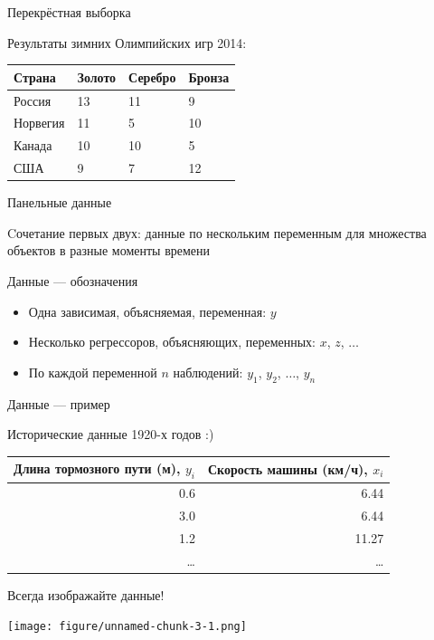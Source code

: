 \documentclass[russian,ignorenonframetext,]{beamer}
\providecommand{\tightlist}{%
  \setlength{\itemsep}{0pt}\setlength{\parskip}{0pt}}
\begin{document}
\begin{frame}{Перекрёстная выборка}

Результаты зимних Олимпийских игр 2014:

\begin{longtable}[c]{@{}llll@{}}
\toprule
Страна & Золото & Серебро & Бронза\tabularnewline
\midrule
\endhead
Россия & 13 & 11 & 9\tabularnewline
Норвегия & 11 & 5 & 10\tabularnewline
Канада & 10 & 10 & 5\tabularnewline
США & 9 & 7 & 12\tabularnewline
\bottomrule
\end{longtable}

\end{frame}

\begin{frame}{Панельные данные}

Cочетание первых двух: данные по нескольким переменным для множества
объектов в разные моменты времени

\end{frame}

\begin{frame}{Данные --- обозначения}

\begin{itemize}
\tightlist
\item
  Одна зависимая, объясняемая, переменная: \(y\)
\item
  Несколько регрессоров, объясняющих, переменных: \(x\), \(z\),
  \(\ldots\)
\item
  По каждой переменной \(n\) наблюдений: \(y_1\), \(y_2\), \(\ldots\),
  \(y_n\)
\end{itemize}

\end{frame}

\begin{frame}{Данные --- пример}

Исторические данные 1920-х годов :)

\begin{longtable}[c]{@{}rr@{}}
\toprule
Длина тормозного пути (м), \(y_i\) & Скорость машины (км/ч),
\(x_i\)\tabularnewline
\midrule
\endhead
0.6 & 6.44\tabularnewline
3.0 & 6.44\tabularnewline
1.2 & 11.27\tabularnewline
\ldots{} & \ldots{}\tabularnewline
\bottomrule
\end{longtable}

\end{frame}

\begin{frame}{Всегда изображайте данные!}

\texttt{[image: figure/unnamed-chunk-3-1.png]}

\end{frame}
\end{document}
